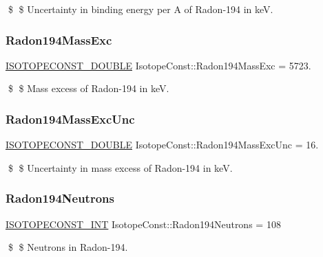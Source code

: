\$ \$ Uncertainty in binding energy per A of Radon-\/194 in keV. \mbox{\label{group___isotope_const-_radon-_rn194_ga1263615cc43489858d1ac9ad8722d988}} 
\subsubsection{\texorpdfstring{Radon194\+Mass\+Exc}{Radon194MassExc}}
{\footnotesize\ttfamily \mbox{\hyperlink{group___isotope_const-_macros_ga8f45a7272ce02c0b4c65c44636ed719a}{I\+S\+O\+T\+O\+P\+E\+C\+O\+N\+S\+T\+\_\+\+D\+O\+U\+B\+LE}} Isotope\+Const\+::\+Radon194\+Mass\+Exc = 5723.}

\$ \$ Mass excess of Radon-\/194 in keV. \mbox{\label{group___isotope_const-_radon-_rn194_ga19cdd077cf9374e406b1d44950427d68}} 
\subsubsection{\texorpdfstring{Radon194\+Mass\+Exc\+Unc}{Radon194MassExcUnc}}
{\footnotesize\ttfamily \mbox{\hyperlink{group___isotope_const-_macros_ga8f45a7272ce02c0b4c65c44636ed719a}{I\+S\+O\+T\+O\+P\+E\+C\+O\+N\+S\+T\+\_\+\+D\+O\+U\+B\+LE}} Isotope\+Const\+::\+Radon194\+Mass\+Exc\+Unc = 16.}

\$ \$ Uncertainty in mass excess of Radon-\/194 in keV. \mbox{\label{group___isotope_const-_radon-_rn194_ga63daeeb203cbc08c3d0729821886e927}} 
\subsubsection{\texorpdfstring{Radon194\+Neutrons}{Radon194Neutrons}}
{\footnotesize\ttfamily \mbox{\hyperlink{group___isotope_const-_macros_ga5f18360b3e99483a35c32d789e62621c}{I\+S\+O\+T\+O\+P\+E\+C\+O\+N\+S\+T\+\_\+\+I\+NT}} Isotope\+Const\+::\+Radon194\+Neutrons = 108}

\$ \$ Neutrons in Radon-\/194. \mbox{\label{group___isotope_const-_radon-_rn194_ga6a8f5ce2994dc52c06b7b13ab0ef95a3}} 
